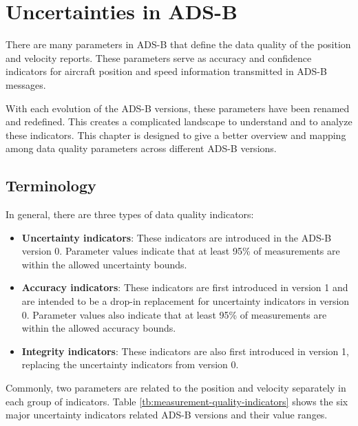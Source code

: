 \chapter{Uncertainties in ADS-B} \label{chap:uncertainty}

There are many parameters in ADS-B that define the data quality of the position and velocity reports. These parameters serve as accuracy and confidence indicators for aircraft position and speed information transmitted in ADS-B messages.

With each evolution of the ADS-B versions, these parameters have been renamed and redefined. This creates a complicated landscape to understand and to analyze these indicators. This chapter is designed to give a better overview and mapping among data quality parameters across different ADS-B versions.

\section{Terminology}
In general, there are three types of data quality indicators:

\begin{itemize}
  \item \textbf{Uncertainty indicators}: These indicators are introduced in the ADS-B version 0. Parameter values indicate that at least 95\% of measurements are within the allowed uncertainty bounds.
  \item \textbf{Accuracy indicators}: These indicators are first introduced in version 1 and are intended to be a drop-in replacement for uncertainty indicators in version 0. Parameter values also indicate that at least 95\% of measurements are within the allowed accuracy bounds.
  \item \textbf{Integrity indicators}: These indicators are also first introduced in version 1, replacing the uncertainty indicators from version 0.
\end{itemize}

Commonly, two parameters are related to the position and velocity separately in each group of indicators. Table \ref{tb:measurement-quality-indicators} shows the six major uncertainty indicators related ADS-B versions and their value ranges.

